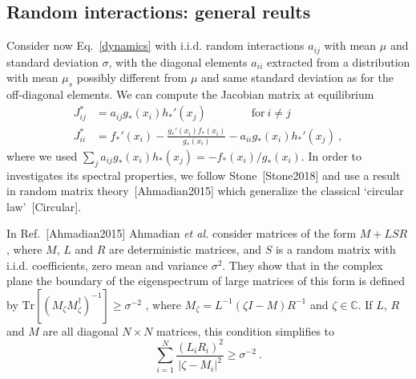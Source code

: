\documentclass[%
 reprint,
 amsmath,amssymb,
 aps,
]{revtex4-2}
\begin{document}
\subsection{Random interactions: general reults}

Consider now Eq.~\eqref{dynamics} with i.i.d. random 
interactions $a_{ij}$ with mean $\mu$ and standard 
deviation $\sigma$, with the diagonal elements $a_{ii}$ 
extracted from a distribution with mean $\mu_s$ 
possibly different from $\mu$ and same standard deviation
as for the off-diagonal elements.  
We can compute the Jacobian matrix at equilibrium
\begin{align}
    J_{ij}^* & = a_{ij}g_*(x_i)h_*'(x_j) \qquad \qquad \textrm{for} \ i\neq j \label{eq: jac off-diag}\\
    J_{ii}^* & = f_*'(x_i) - \frac{g_*'(x_i)f_*(x_i)}{g_*(x_i)} - a_{ii}g_*(x_i)h_*'(x_j) \ , \label{eq: jac diag}
\end{align}
where we used $\sum_{j}a_{ij}g_*(x_i)h_*(x_j)=-f_*(x_i)/g_*(x_i)$.
In order to investigates its spectral properties, 
we follow Stone~[Stone2018] and use a
result in random matrix theory~[Ahmadian2015]
which generalize the classical `circular law'~[Circular].

In Ref.~[Ahmadian2015] Ahmadian \emph{et al.} 
consider matrices of the form $M + LSR$, where $M$,  
$L$ and $R$ are deterministic matrices, and $S$ 
is a random matrix with i.i.d. coefficients, 
zero mean and variance $\sigma^2$. They 
show that in the complex plane the boundary of the 
eigenspectrum of large matrices of this form is defined by
$\textrm{Tr}[(M_\zeta M_\zeta^\dagger)^{-1}]\geq \sigma^{-2}$ , 
where $M_\zeta = L^{-1}(\zeta I - M)R^{-1}$ and $\zeta\in\mathbb{C}$. 
If $L$, $R$ and $M$ are all diagonal $N\times N$ matrices, 
this condition simplifies to
\begin{equation}
    \sum_{i=1}^N\frac{(L_{i}R_{i})^2}{ \vert \zeta - M_{i}\vert^2 }\geq \sigma^{-2} \ .
\label{eq: domain}
\end{equation}
\end{document}
